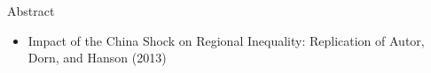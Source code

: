 \begin{frame}{Abstract}
    \begin{itemize}
        \item Impact of the China Shock on Regional Inequality: Replication of Autor, Dorn, and Hanson (2013)
    \end{itemize}
\end{frame}